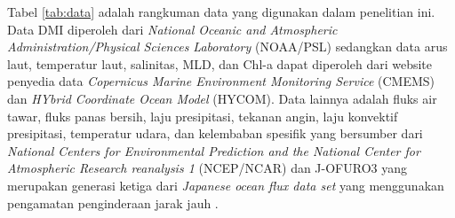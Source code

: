 \begin{spacing}{1.5}
	Tabel \ref*{tab:data} adalah rangkuman data yang digunakan dalam penelitian ini. Data DMI diperoleh dari \textit{National Oceanic and Atmospheric Administration/Physical Sciences Laboratory} (NOAA/PSL) \cite{Saji2003} sedangkan data arus laut, temperatur laut, salinitas, MLD, dan Chl-a dapat diperoleh dari website penyedia data \textit{Copernicus Marine Environment Monitoring Service} (CMEMS)\cite{Lellouche2018} dan \textit{HYbrid Coordinate Ocean Model} (HYCOM)\cite{Chassignet2007}. Data lainnya adalah fluks air tawar, fluks panas bersih, laju presipitasi, tekanan angin, laju konvektif presipitasi, temperatur udara, dan kelembaban spesifik yang bersumber dari \textit{National Centers for Environmental Prediction and the National Center for Atmospheric Research reanalysis 1} (NCEP/NCAR) \cite{Kalnay1996} dan J-OFURO3 yang merupakan generasi ketiga dari \textit{Japanese ocean flux data set} yang menggunakan pengamatan penginderaan jarak jauh \cite{Tomita2019}. 
	

\end{spacing}
